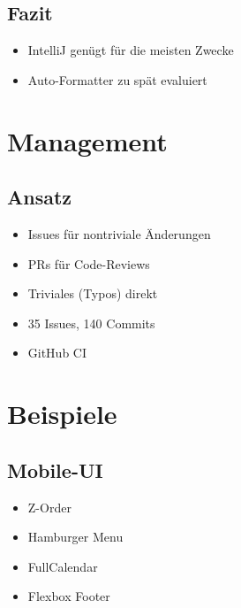 \documentclass{sdqbeamer}
\begin{document}
\subsection{Fazit}
\begin{frame}{\insertsubsectionhead}
    \begin{itemize}
        \item IntelliJ genügt für die meisten Zwecke
        \item Auto-Formatter zu spät evaluiert
    \end{itemize}
\end{frame}



\section{Management}

\subsection{Ansatz}
\begin{frame}{\insertsubsectionhead}
    \begin{itemize}
        \item Issues für nontriviale Änderungen
        \item PRs für Code-Reviews
        \item Triviales (Typos) direkt
        \item 35 Issues, 140 Commits
        \item GitHub CI
    \end{itemize}
\end{frame}



\section{Beispiele}

\subsection{Mobile-UI}
\begin{frame}{\insertsubsectionhead}
    \begin{itemize}
        \item Z-Order
        \item Hamburger Menu
        \item FullCalendar
        \item Flexbox Footer
    \end{itemize}
\end{frame}
\end{document}
